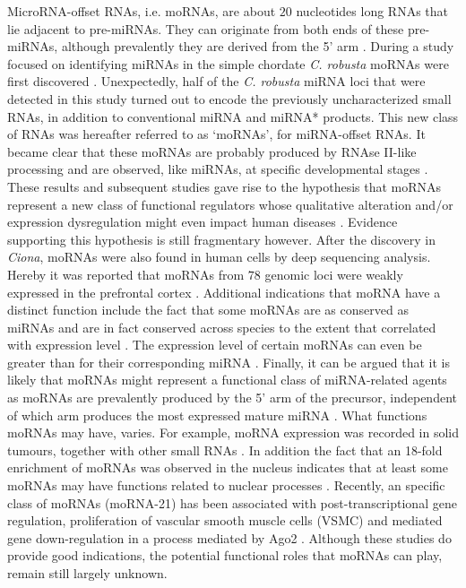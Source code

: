 \documentclass[graybox]{svmult}
\begin{document}
MicroRNA-offset RNAs, i.e. moRNAs, are about $20$ nucleotides long RNAs 
that lie adjacent to pre-miRNAs. They can originate from both ends of these 
pre-miRNAs, although prevalently they are derived from the 5' arm 
\cite{bortoluzzi2011}. During a study focused on identifying miRNAs in the 
simple chordate \textit{C. robusta} moRNAs were first discovered 
\cite{Shi2009}. Unexpectedly, half of the \textit{C. robusta} miRNA loci 
that were detected in this study turned out to encode the 
previously uncharacterized small RNAs, in addition to conventional miRNA and 
miRNA* products. This new class of RNAs was hereafter referred to as `moRNAs', 
for miRNA-offset RNAs. It became clear that these moRNAs are probably produced 
by RNAse II-like processing and are observed, like miRNAs, at specific 
developmental stages \cite{Shi2009}.
These results and subsequent studies gave rise to the hypothesis that moRNAs 
represent a new class of functional regulators whose qualitative alteration 
and/or expression dysregulation might even impact human diseases 
\cite{bortoluzzi2011}. Evidence supporting this hypothesis is still fragmentary 
however. After the discovery in \textit{Ciona}, moRNAs were 
also found in human cells by deep sequencing analysis. Hereby it was reported 
that moRNAs from $78$ genomic loci were weakly expressed in the prefrontal 
cortex \cite{Langenberger2009}. Additional indications that moRNA have a 
distinct function include the fact that some moRNAs are as conserved as miRNAs 
and are in fact conserved across species to the extent that correlated with 
expression level \cite{Shi2009}. The expression level of certain moRNAs can 
even be greater than for their corresponding miRNA \cite{Umbach2010}. Finally, 
it can be argued \cite{bortoluzzi2011} that it is likely that moRNAs might 
represent a functional class of miRNA-related agents as moRNAs are prevalently 
produced by the 5' arm of the precursor, independent of which arm produces the 
most expressed mature miRNA \cite{Langenberger2009, Umbach2010}. 
What functions moRNAs may have, varies. For example, moRNA expression was 
recorded in solid tumours, together with other small RNAs \cite{Meiri2010}. 
In addition the fact that an 18-fold enrichment of moRNAs was observed in the 
nucleus \cite{Taft2010} indicates that at least some moRNAs may have functions 
related to nuclear processes \cite{bortoluzzi2011}. Recently, an specific class 
of moRNAs (moRNA-21) has been associated with post-transcriptional gene 
regulation, proliferation of vascular smooth muscle cells (VSMC) and mediated 
gene down-regulation in a process mediated by Ago2 \cite{Zhao2016}. Although 
these studies do provide good indications, the potential functional roles that 
moRNAs can play, remain still largely unknown.
\end{document}
